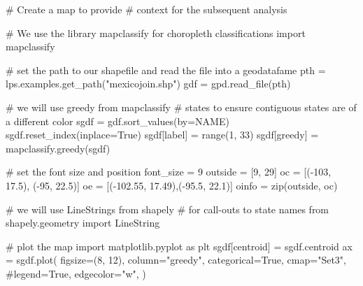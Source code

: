 \documentclass[
  a4paper, 
  twoside,
  final
]{article}
\newenvironment{Shaded}{\begin{snugshade}}{\end{snugshade}}
\newcommand{\BuiltInTok}[1]{\textcolor[rgb]{0.00,0.23,0.31}{#1}}
\newcommand{\CommentTok}[1]{\textcolor[rgb]{0.37,0.37,0.37}{#1}}
\newcommand{\DecValTok}[1]{\textcolor[rgb]{0.68,0.00,0.00}{#1}}
\newcommand{\FloatTok}[1]{\textcolor[rgb]{0.68,0.00,0.00}{#1}}
\newcommand{\ImportTok}[1]{\textcolor[rgb]{0.00,0.46,0.62}{#1}}
\newcommand{\NormalTok}[1]{\textcolor[rgb]{0.00,0.23,0.31}{#1}}
\newcommand{\OperatorTok}[1]{\textcolor[rgb]{0.37,0.37,0.37}{#1}}
\newcommand{\StringTok}[1]{\textcolor[rgb]{0.13,0.47,0.30}{#1}}
\newcommand{\VariableTok}[1]{\textcolor[rgb]{0.07,0.07,0.07}{#1}}
\begin{document}
\begin{Shaded}
\begin{Highlighting}[]
\CommentTok{\# Create a map to provide}
\CommentTok{\# context for the subsequent analysis}

\CommentTok{\# We use the library mapclassify for choropleth classifications}
\ImportTok{import}\NormalTok{ mapclassify}

\CommentTok{\# set the path to our shapefile and read the file into a geodatafame}
\NormalTok{pth }\OperatorTok{=}\NormalTok{ lps.examples.get\_path(}\StringTok{"mexicojoin.shp"}\NormalTok{)}
\NormalTok{gdf }\OperatorTok{=}\NormalTok{ gpd.read\_file(pth)}

\CommentTok{\# we will use greedy from mapclassify}
\CommentTok{\# states to ensure contiguous states are of a different color}
\NormalTok{sgdf }\OperatorTok{=}\NormalTok{ gdf.sort\_values(by}\OperatorTok{=}\StringTok{\textquotesingle{}NAME\textquotesingle{}}\NormalTok{)}
\NormalTok{sgdf.reset\_index(inplace}\OperatorTok{=}\VariableTok{True}\NormalTok{)}
\NormalTok{sgdf[}\StringTok{\textquotesingle{}label\textquotesingle{}}\NormalTok{] }\OperatorTok{=} \BuiltInTok{range}\NormalTok{(}\DecValTok{1}\NormalTok{, }\DecValTok{33}\NormalTok{)}
\NormalTok{sgdf[}\StringTok{\textquotesingle{}greedy\textquotesingle{}}\NormalTok{] }\OperatorTok{=}\NormalTok{ mapclassify.greedy(sgdf)}

\CommentTok{\# set the font size and position}
\NormalTok{font\_size }\OperatorTok{=} \DecValTok{9}
\NormalTok{outside }\OperatorTok{=}\NormalTok{ [}\DecValTok{9}\NormalTok{, }\DecValTok{29}\NormalTok{]}
\NormalTok{oc }\OperatorTok{=}\NormalTok{ [(}\OperatorTok{{-}}\DecValTok{103}\NormalTok{, }\FloatTok{17.5}\NormalTok{), (}\OperatorTok{{-}}\DecValTok{95}\NormalTok{, }\FloatTok{22.5}\NormalTok{)]}
\NormalTok{oe }\OperatorTok{=}\NormalTok{ [(}\OperatorTok{{-}}\FloatTok{102.55}\NormalTok{, }\FloatTok{17.49}\NormalTok{),(}\OperatorTok{{-}}\FloatTok{95.5}\NormalTok{, }\FloatTok{22.1}\NormalTok{)] }
\NormalTok{oinfo }\OperatorTok{=} \BuiltInTok{zip}\NormalTok{(outside, oc)}

\CommentTok{\# we will use LineStrings from shapely}
\CommentTok{\# for call{-}outs to state names}
\ImportTok{from}\NormalTok{ shapely.geometry }\ImportTok{import}\NormalTok{ LineString}

\CommentTok{\# plot the map }
\ImportTok{import}\NormalTok{ matplotlib.pyplot }\ImportTok{as}\NormalTok{ plt}
\NormalTok{sgdf[}\StringTok{\textquotesingle{}centroid\textquotesingle{}}\NormalTok{] }\OperatorTok{=}\NormalTok{ sgdf.centroid}
\NormalTok{ax }\OperatorTok{=}\NormalTok{ sgdf.plot(}
\NormalTok{    figsize}\OperatorTok{=}\NormalTok{(}\DecValTok{8}\NormalTok{, }\DecValTok{12}\NormalTok{),}
\NormalTok{    column}\OperatorTok{=}\StringTok{"greedy"}\NormalTok{,}
\NormalTok{    categorical}\OperatorTok{=}\VariableTok{True}\NormalTok{,}
\NormalTok{    cmap}\OperatorTok{=}\StringTok{"Set3"}\NormalTok{,}
    \CommentTok{\#legend=True,}
\NormalTok{    edgecolor}\OperatorTok{=}\StringTok{"w"}\NormalTok{,}
\NormalTok{)}


\end{Highlighting}
\end{Shaded}
\end{document}
